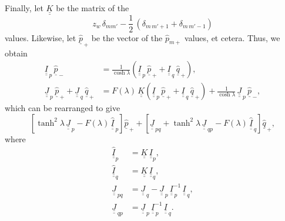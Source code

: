 \documentclass[12pt,prb,aps,notitlepage]{revtex4-1}
\begin{document}
Finally, let $\underline{\underline{K}}$ be the matrix of the 
\begin{equation}
z_w\,\delta_{mm'} -\frac{1}{2}\,(\delta_{m\,m'+1}+\delta_{m\,m'-1})
\end{equation}
values. Likewise, let $\underline{\hat{p}}_{\,+}$ be the vector of the $\hat{p}_{m+}$ values, et cetera. Thus, we
obtain
\begin{align}
\underline{\underline{I}}_{\,p}\,\underline{\hat{p}}_{\,-} &= \frac{1}{\cosh\lambda}\left(\underline{\underline{I}}_{\,p}\,\underline{\hat{p}}_{\,+} + \underline{\underline{I}}_{\,q}\,\underline{\hat{q}}_{\,+}\right),\\[0.5ex]
\underline{\underline{J}}_{\,p}\,\underline{\hat{p}}_{\,+}+ \underline{\underline{J}}_{\,q}\,\underline{\hat{q}}_{\,+} &=
F(\lambda)\,\underline{\underline{K}}\left(\underline{\underline{I}}_{\,p}\,\underline{\hat{p}}_{\,+}+ \underline{\underline{I}}_{\,q}\,\underline{\hat{q}}_{\,+} \right)
+\frac{1}{\cosh\lambda} \,\underline{\underline{J}}_{\,p}\,\underline{\hat{p}}_{\,-},
\end{align}
which can be rearranged to give 
\begin{equation}\label{e73}
\left[\tanh^2\lambda\,\underline{\underline{J}}_{\,p}-F(\lambda)\,\underline{\underline{\hat{I}}}_{\,p}\right]\underline{\hat{p}}_{\,+}+
\left[\underline{\underline{J}}_{\,pq}+\tanh^2\lambda\,\underline{\underline{J}}_{\,qp} - F(\lambda)\,\underline{\underline{\hat{I}}}_{\,q}\right]\underline{\hat{q}}_{\,+},
\end{equation}
where
\begin{align}
\underline{\underline{\hat I}}_p &= \underline{\underline{K}}\,\underline{\underline{I}}_p,\\[0.5ex]
\underline{\underline{\hat I}}_q &= \underline{\underline{K}}\,\underline{\underline{I}}_q,\\[0.5ex]
\underline{\underline{J}}_{\,pq} &=\underline{\underline{J}}_{\,q}- \underline{\underline{J}}_{\,p}\,\underline{\underline{I}}_{\,p}^{-1}\,\underline{\underline{I}}_{\,q},\\[0.5ex]
\underline{\underline{J}}_{\,qp} &= \underline{\underline{J}}_{\,p}\,\underline{\underline{I}}_{\,p}^{-1}\,\underline{\underline{I}}_{\,q}.
\end{align}
\end{document}
